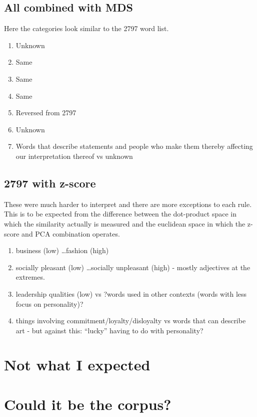 \documentclass[eric_thesis.tex]{subfiles}
\begin{document}
\subsection{All combined with MDS}

Here the categories look similar to the 2797 word list. 

\begin{enumerate}
 \item Unknown
 \item Same
 \item Same
 \item Same
 \item Reversed from 2797
 \item Unknown
 \item Words that describe statements and people who make them thereby 
       affecting our interpretation thereof vs unknown
\end{enumerate}

\subsection{2797 with z-score}

These were much harder to interpret and there are more exceptions to each rule. 
This is to be expected from the difference between the dot-product space in 
which the similarity actually is measured and the euclidean space in which the 
z-score and PCA combination operates.

\begin{enumerate}
 \item business (low) \ldots fashion (high)
 \item socially pleasant (low) \ldots socially unpleasant (high) - mostly 
adjectives at the extremes.
 \item leadership qualities (low) vs ?words used in other contexts (words with 
less focus on personality)?
 \item things involving commitment/loyalty/disloyalty vs words that can 
describe art - but against this: ``lucky'' having to do with personality?
\end{enumerate}


\section{Not what I expected}

\section{Could it be the corpus?}
\end{document}
